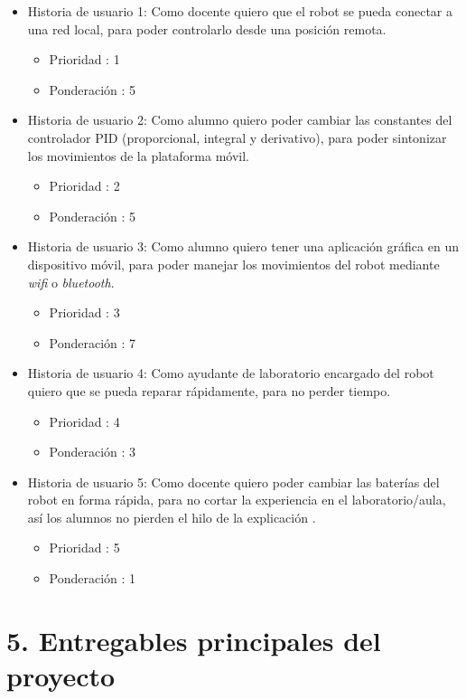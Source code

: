 \documentclass[11pt]{charter}
\begin{document}
\begin{itemize}
\item Historia de usuario 1: Como docente quiero que el robot se pueda conectar a una red local, para poder controlarlo desde una posición remota.
	\begin{itemize}
	\item Prioridad : 1
	\item Ponderación : 5
	\end{itemize}
\item Historia de usuario 2: Como alumno quiero poder cambiar las constantes del controlador PID (proporcional, integral y derivativo), para poder sintonizar los movimientos de la plataforma móvil. 
	\begin{itemize}
	\item Prioridad : 2
	\item Ponderación : 5
	\end{itemize}	
\item Historia de usuario 3:  Como alumno quiero tener una aplicación  gráfica en un dispositivo móvil, para poder manejar los movimientos del robot mediante \textit{wifi} o \textit{bluetooth}. 
	\begin{itemize}
	\item Prioridad : 3
	\item Ponderación : 7
	\end{itemize}
\item Historia de usuario 4: Como ayudante de laboratorio encargado del robot quiero que se pueda reparar rápidamente, para no perder tiempo. 
	\begin{itemize}
	\item Prioridad : 4
	\item Ponderación : 3
	\end{itemize}	
\item Historia de usuario 5: Como docente quiero poder cambiar las baterías del robot en forma rápida, para no cortar la experiencia en el laboratorio/aula,  así los alumnos no pierden el hilo de la explicación .
	\begin{itemize}
	\item Prioridad : 5
	\item Ponderación : 1
	\end{itemize}		
\end{itemize}


\section{5. Entregables principales del proyecto}
\label{sec:entregables}
\end{document}
